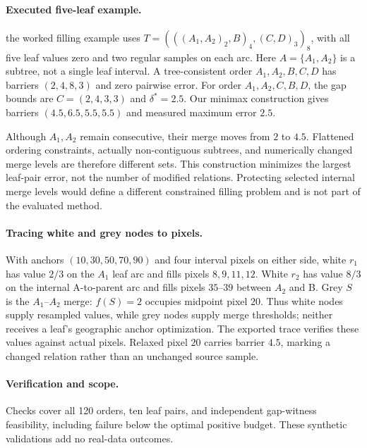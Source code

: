 \paragraph{Executed five-leaf example.}
the worked filling example uses $T=(((A_1,A_2)_2,B)_4,(C,D)_3)_8$, with all five leaf values zero and two regular samples on each arc. Here $A=\{A_1,A_2\}$ is a subtree, not a single leaf interval. A tree-consistent order $A_1,A_2,B,C,D$ has barriers $(2,4,8,3)$ and zero pairwise error. For order $A_1,A_2,C,B,D$, the gap bounds are $C=(2,4,3,3)$ and $\delta^*=2.5$. Our minimax construction gives barriers $(4.5,6.5,5.5,5.5)$ and measured maximum error $2.5$.

Although $A_1,A_2$ remain consecutive, their merge moves from $2$ to $4.5$. Flattened ordering constraints, actually non-contiguous subtrees, and numerically changed merge levels are therefore different sets. This construction minimizes the largest leaf-pair error, not the number of modified relations. Protecting selected internal merge levels would define a different constrained filling problem and is not part of the evaluated method.

\paragraph{Tracing white and grey nodes to pixels.}
With anchors $(10,30,50,70,90)$ and four interval pixels on either side, white $r_1$ has value $2/3$ on the $A_1$ leaf arc and fills pixels $8,9,11,12$. White $r_2$ has value $8/3$ on the internal A-to-parent arc and fills pixels $35$--$39$ between $A_2$ and B. Grey $S$ is the $A_1$--$A_2$ merge: $f(S)=2$ occupies midpoint pixel $20$. Thus white nodes supply resampled values, while grey nodes supply merge thresholds; neither receives a leaf's geographic anchor optimization. The exported trace verifies these values against actual pixels. Relaxed pixel $20$ carries barrier $4.5$, marking a changed relation rather than an unchanged source sample.



\paragraph{Verification and scope.}
Checks cover all 120 orders, ten leaf pairs, and independent gap-witness feasibility, including failure below the optimal positive budget. These synthetic validations add no real-data outcomes.
